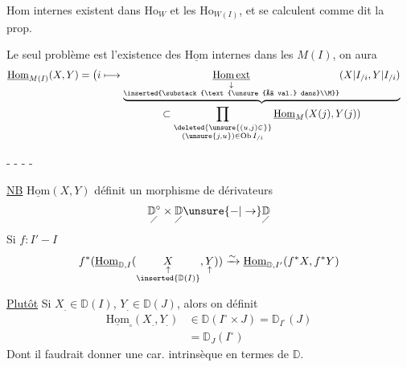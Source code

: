 $\mathrm{Hom}$ internes existent dans  $\mathrm{Ho}_W$ et les $\mathrm{Ho}_{W(I)}$, et se calculent comme dit  la prop.

Le seul problème est l'existence des $\underline{\mathrm{Hom}}$ internes dans les $M(I)$, on aura
\[
\begin{aligned}
\underline{\mathrm{Hom}}_{M(I)}(X,Y)
 &=\bigl(i\longmapsto
 \underbrace{\underset{\substack{\downarrow\\\inserted{\substack{\text{\unsure{à val.} dans}\\M}}}}{\underline{\mathrm{Hom}\,\mathrm{ext}}}
 (X\vert I_{/i},Y\vert I_{/i})}_{\displaystyle
 \subset\prod_{\substack{\deleted{\unsure{(u,j)\in}}\\(\unsure{j,u})\in\mathrm{Ob}\,I_{/i}}}\underline{\mathrm{Hom}}_M(X(j),Y(j))}
\end{aligned}
\]

- - - -

\uline{NB}  $\underline{\mathrm{Hom}}(X,Y)$ définit un morphisme de dérivateurs
\[
\underset{\diagup}{\mathbb{D}^{\circ}}\times\underset{\diagup}{\mathbb{D}}\unsure{-|\to}\underset{\diagup}{\mathbb{D}}
\]
Si $f:I'-I$
\[
 f^*(\underline{\mathrm{Hom}}_{\mathbb{D},I}
 (\underset{\substack{\uparrow\\\inserted{\mathbb{D}(I)}}}{X},\underset{\uparrow}{Y}))
 \xrightarrow{\sim}\underline{\mathrm{Hom}}_{\mathbb{D},I'}(f^*X,f^*Y)
\]

\uline{Plutôt} Si $X_{.}\in\mathbb{D}(I)$, $Y_{.}\in\mathbb{D}(J)$, alors on définit
\[
\begin{aligned}
\underline{\mathrm{Hom}}_{\square}(X_{.},Y_{.})&\in\mathbb{D}(I^\circ\times J)=\mathbb{D}_{I^\circ}(J)\\
&=\mathbb{D}_J(I^\circ)
\end{aligned}
\]
Dont il faudrait donner une car. intrinsèque en termes de $\mathbb{D}$. 

